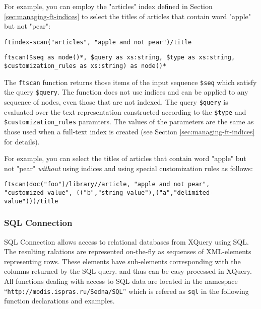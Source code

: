 \documentclass[a4paper,12pt]{article}
\begin{document}
For example, you can employ the "articles" index defined in Section \ref{sec:managing-ft-indices} to select the titles of articles that contain word "apple" but not "pear":
\begin{verbatim}
ftindex-scan("articles", "apple and not pear")/title
\end{verbatim}

\begin{verbatim}
ftscan($seq as node()*, $query as xs:string, $type as xs:string,
$customization_rules as xs:string) as node()*
\end{verbatim}

The \verb!ftscan! function returns those items of the input sequence \verb!$seq! which satisfy the query \verb!$query!. The function does not use indices and can be applied to any sequence of nodes, even those that are not indexed. The query \verb!$query! is evaluated over the text representation constructed according to the \verb!$type! and \verb!$customization_rules! paramters. The values of the parameters are the same as those used when a full-text index is created (see Section \ref{sec:managing-ft-indices} for details).

For example, you can select the titles of articles that contain word "apple" but not "pear" \emph{without} using indices and using special customization rules as follows:
\begin{verbatim}
ftscan(doc("foo")/library//article, "apple and not pear",
"customized-value", (("b","string-value"),("a","delimited-value")))/title
\end{verbatim}




\subsubsection{SQL Connection}
SQL Connection allows access to relational databases from XQuery using SQL.
The resulting ralations are represented on-the-fly as sequenses of XML-elements representing rows. These elements have sub-elements corresponding with the columns returned by the SQL query. and thus can be
easy processed in XQuery. All functions dealing with access to SQL data are located in the namespace
``\verb!http://modis.ispras.ru/Sedna/SQL!'' which is refered as \verb!sql!
in the following function declarations and examples.
\end{document}
